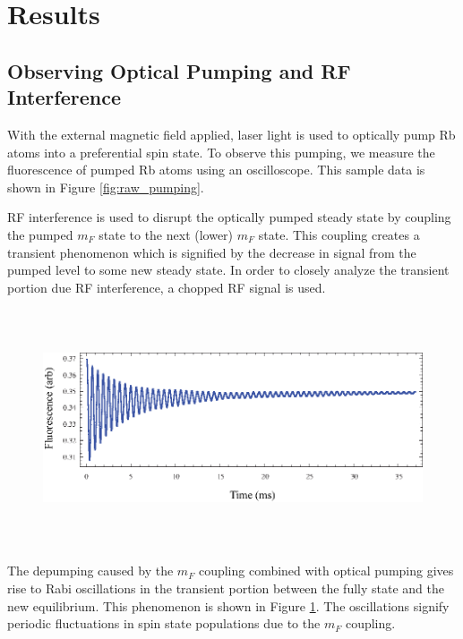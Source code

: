 
\section{Results}\label{results}

\subsection{Observing Optical Pumping and RF Interference}

With the external magnetic field applied, laser light is used to optically pump Rb atoms into a preferential spin state.  To observe this pumping, we measure the fluorescence of pumped Rb atoms using an oscilloscope.  This sample data is shown in Figure \ref{fig:raw_pumping}.

RF interference is used to disrupt the optically pumped steady state by coupling the pumped $m_F$ state to the next (lower) $m_F$ state.  This coupling creates a transient phenomenon which is signified by the decrease in signal from the pumped level to some new steady state.  In order to closely analyze the transient portion due RF interference, a chopped RF signal is used.  
\begin{figure}[htbp]
\begin{center}
\includegraphics[height=70mm]{./figures/rabi.eps}
\caption{\small{}}
\label{fig:rabi}
\end{center}
\end{figure}
The depumping caused by the $m_F$ coupling combined with optical pumping gives rise to Rabi oscillations in the transient portion between the fully state and the new equilibrium.  This phenomenon is shown in Figure \ref{fig:rabi}.  The oscillations signify periodic fluctuations in spin state populations due to the $m_F$ coupling.    

